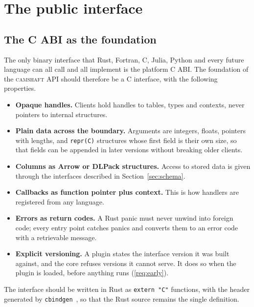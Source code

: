 \documentclass[11pt,a4paper]{article}
\newcommand{\camshaft}{\textsc{camshaft}}
\newcommand{\code}[1]{\texttt{#1}}
\begin{document}
\section{The public interface}
\label{sec:api}

\subsection{The C ABI as the foundation}

The only binary interface that Rust, Fortran, C, Julia, Python and every
future language can all call and all implement is the platform C ABI.  The
foundation of the \camshaft{} API should therefore be a C interface, with the
following properties.

\begin{itemize}
  \item \textbf{Opaque handles.}  Clients hold handles to tables, types and
        contexts, never pointers to internal structures.
  \item \textbf{Plain data across the boundary.}  Arguments are integers,
        floats, pointers with lengths, and \code{repr(C)} structures whose
        first field is their own size, so that fields can be appended in
        later versions without breaking older clients.
  \item \textbf{Columns as Arrow or DLPack structures.}  Access to stored data
        is given through the interfaces described in
        Section~\ref{sec:schema}.
  \item \textbf{Callbacks as function pointer plus context.}  This is how
        handlers are registered from any language.
  \item \textbf{Errors as return codes.}  A Rust panic must never unwind into
        foreign code; every entry point catches panics and converts them to an
        error code with a retrievable message.
  \item \textbf{Explicit versioning.}  A plugin states the interface version
        it was built against, and the core refuses versions it cannot serve.
        It does so when the plugin is loaded, before anything runs
        (\ref{req:early}).
\end{itemize}

The interface should be written in Rust as \code{extern "C"} functions, with
the header generated by \code{cbindgen}~\cite{cbindgen}, so that the Rust
source remains the single definition.
\end{document}
